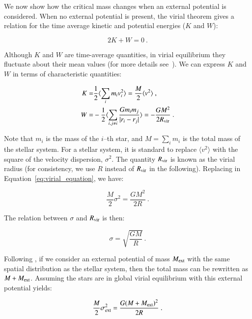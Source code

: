 \begin{appendixs}
	We now show how the critical mass changes when an external potential is considered. When no external potential is present, the virial theorem gives a relation for the time average kinetic and potential energies ($K$ and $W$):
	
	\begin{equation}
		\label{eq:virial_equation}
		2K+W=0~.
	\end{equation}
	
	Although $K$ and $W$ are time-average quantities, in virial equilibrium they fluctuate about their mean values (for more details see~\citet{collins1978virial}). We can express $K$ and $W$ in terms of characteristic quantities:
	
	\begin{align}
		K =& \frac{1}{2} \langle \sum_{i} m_i v_i^2 \rangle  = \frac{M}{2} \langle v^2 \rangle ~,\\
		W =& - \frac{1}{2} \langle \sum_{i, j \neq i} \frac{G m_i m_j}{|r_i - r_j|} \rangle = - \frac{G M^2}{2R_{\rm vir}}~.
	\end{align}
	
	Note that $m_i$ is the mass of the $i$--th star, and $M = \sum_{i} m_i$ is the total mass of the stellar system. For a stellar system, it is standard to replace $\langle v^2 \rangle$ with the square of the velocity dispersion, $\sigma^2$. The quantity $R_{\rm vir}$ is known as the virial radius (for consistency, we use $R$ instead of $R_{\rm vir}$ in the following). Replacing in Equation~\eqref{eq:virial_equation}, we have:
	
	\begin{equation}
		\frac{M}{2} \sigma^2 = \frac{GM^2}{2 R}~.
	\end{equation}
	
	The relation between $\sigma$ and $R_{\rm vir}$ is then:
	
	\begin{equation}
		\sigma = \sqrt{\frac{GM}{R}}~.
	\end{equation}
	
	Following \citet{reinoso2020effects}, if we consider an external potential of mass $M_{\rm ext}$ with the same spatial distribution as the stellar system, then the total mass can be rewritten as $M + M_{\rm ext}$. Assuming the stars are in global virial equilibrium with this external potential yields:
	
	\begin{equation}
		\frac{M}{2} \sigma_{\rm ext}^2 = \frac{G(M + M_{\rm ext})^2}{2 R}~.
	\end{equation}
	

\end{appendixs}

